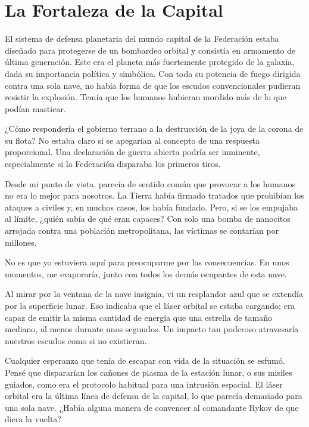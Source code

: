 \chapter{La Fortaleza de la Capital}\label{sec:la-fortaleza-de-la-capital}

El sistema de defensa planetaria del mundo capital de la Federación estaba diseñado para protegerse de un bombardeo orbital y consistía en armamento de última generación. Este era el planeta más fuertemente protegido de la galaxia, dada su importancia política y simbólica. Con toda su potencia de fuego dirigida contra una sola nave, no había forma de que los escudos convencionales pudieran resistir la explosión. Temía que los humanos hubieran mordido más de lo que podían masticar.

¿Cómo respondería el gobierno terrano a la destrucción de la joya de la corona de su flota? No estaba claro si se apegarían al concepto de una respuesta proporcional. Una declaración de guerra abierta podría ser inminente, especialmente si la Federación disparaba los primeros tiros.

Desde mi punto de vista, parecía de sentido común que provocar a los humanos no era lo mejor para nosotros. La Tierra había firmado tratados que prohibían los ataques a civiles y, en muchos casos, los había fundado. Pero, si se los empujaba al límite, ¿quién sabía de qué eran capaces? Con solo una bomba de nanocitos arrojada contra una población metropolitana, las víctimas se contarían por millones.

No es que yo estuviera aquí para preocuparme por las consecuencias. En unos momentos, me evaporaría, junto con todos los demás ocupantes de esta nave.

Al mirar por la ventana de la nave insignia, vi un resplandor azul que se extendía por la superficie lunar. Eso indicaba que el láser orbital se estaba cargando; era capaz de emitir la misma cantidad de energía que una estrella de tamaño mediano, al menos durante unos segundos. Un impacto tan poderoso atravesaría nuestros escudos como si no existieran.

Cualquier esperanza que tenía de escapar con vida de la situación se esfumó. Pensé que dispararían los cañones de plasma de la estación lunar, o sus misiles guiados, como era el protocolo habitual para una intrusión espacial. El láser orbital era la última línea de defensa de la capital, lo que parecía demasiado para una sola nave. ¿Había alguna manera de convencer al comandante Rykov de que diera la vuelta?


